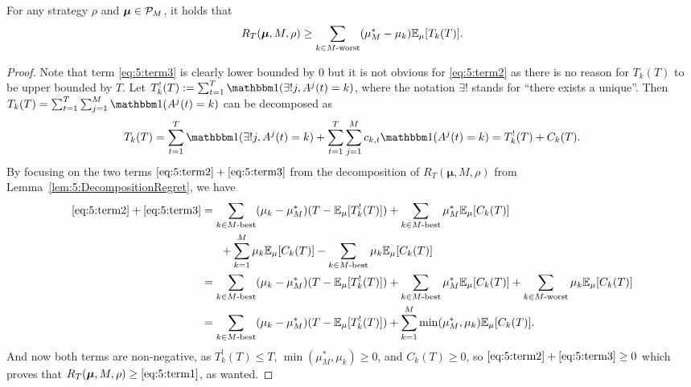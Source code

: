 \begin{lemma}\label{lem:5:1stLowerBound}
    For any strategy $\rho$ and $\boldsymbol{\mu}\in\mathcal{P}_M$, it holds that
    \begin{align*}
        R_T(\boldsymbol{\mu}, M, \rho)    \geq \sum\limits_{k \in M\text{-}\mathrm{worst}} (\mu_M^*- \mu_k) \mathbb{E}_{\mu}[T_k(T)].
    \end{align*}
\end{lemma}

\begin{proof}
  Note that term \ref{eq:5:term3} is clearly lower bounded by $0$
  but it is not obvious for \ref{eq:5:term2} as there is no reason for $T_k(T)$ to be upper bounded by $T$.
  Let $T_k^{!}(T) := \sum_{t=1}^{T} \indic(\exists! j, A^j(t)=k)$,
  where the notation $\exists!$ stands for ``there exists a unique''.
  Then $T_k(T) = \sum_{t=1}^{T} \sum_{j=1}^{M} \indic(A^j(t) = k)$ can be decomposed as
  \begin{equation*}
    T_k(T) = \sum_{t=1}^{T} \indic(\exists! j, A^j(t) = k) + \sum_{t=1}^{T} \sum_{j=1}^{M} c_{k,t} \indic(A^j(t) = k)
    = T_k^{!}(T) + C_k(T).
  \end{equation*}
  By focusing on the two terms $\ref{eq:5:term2} + \ref{eq:5:term3}$ from the decomposition of $R_T(\boldsymbol{\mu}, M, \rho)$ from Lemma~\ref{lem:5:DecompositionRegret}, we have
  \begin{align*}
    \ref{eq:5:term2} + \ref{eq:5:term3} &=
    \sum_{k \in M\text{-}\mathrm{best}} (\mu_k - \mu_M^*) (T - \mathbb{E}_{\mu}[T_k^!(T)])
    + \sum_{k \in M\text{-}\mathrm{best}} \mu_M^* \mathbb{E}_{\mu}[C_k(T)] \\
    & \;\;\;\;\;\; + \sum_{k=1}^{M} \mu_k \mathbb{E}_{\mu}[C_k(T)]
    - \sum_{k \in M\text{-}\mathrm{best}} \mu_k \mathbb{E}_{\mu}[C_k(T)] \\
    &=
    \sum_{k \in M\text{-}\mathrm{best}} (\mu_k - \mu_M^*) (T - \mathbb{E}_{\mu}[T_k^!(T)])
    + \sum_{k \in M\text{-}\mathrm{best}} \mu_M^* \mathbb{E}_{\mu}[C_k(T)]
    + \sum_{k \in M\text{-}\mathrm{worst}} \mu_k \mathbb{E}_{\mu}[C_k(T)] \\
    &=
    \sum_{k \in M\text{-}\mathrm{best}} (\mu_k - \mu_M^*) (T - \mathbb{E}_{\mu}[T_k^!(T)])
    + \sum_{k=1}^{M} \min(\mu_M^*, \mu_k) \mathbb{E}_{\mu}[C_k(T)].
  \end{align*}
  And now both terms are non-negative, as $T_k^!(T) \leq T$, $\min(\mu_M^*, \mu_k)\geq 0$, and $C_k(T) \geq 0$, so $\ref{eq:5:term2} + \ref{eq:5:term3} \geq 0$
  which proves that $R_T(\boldsymbol{\mu}, M, \rho) \geq \ref{eq:5:term1}$, as wanted.
\end{proof}


